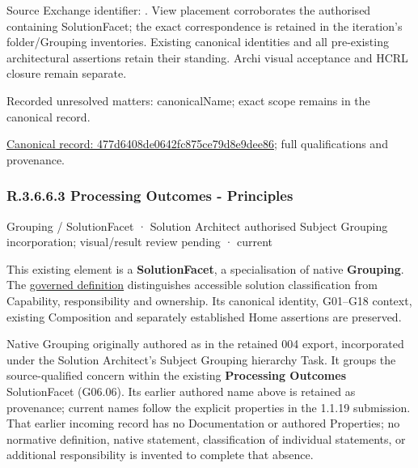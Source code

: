 Source Exchange identifier: \texttt{}. View placement corroborates
the authorised containing SolutionFacet; the exact correspondence is retained in the
iteration's folder/Grouping inventories. Existing canonical identities and all
pre-existing architectural assertions retain their standing. Archi visual
acceptance and HCRL closure remain separate.


{\small Recorded unresolved matters: canonicalName; exact scope remains in the canonical record.}\par
{\footnotesize \href{../../../../../../../continuum/grouping/477d6408de0642fc875ce79d8e9dee86.md}{Canonical record: 477d6408de0642fc875ce79d8e9dee86}; full qualifications and provenance.}\par
\subsubsection*{R.3.6.6.3 Processing Outcomes - Principles}
\label{navigation:R.3.6.6.3}

\label{element:5a4a41f263424c1aac14102b64f95bd0}
{\small Grouping / SolutionFacet · Solution Architect authorised Subject Grouping incorporation; visual/result review pending · current}\par

This existing element is a \textbf{SolutionFacet}, a specialisation of native
\textbf{Grouping}. The \href{\detokenize{../../../../../../../governance/continuum-representation.md#solutionfacet-classification--1119-candidate}}{governed definition}
distinguishes accessible solution classification from Capability, responsibility
and ownership. Its canonical identity, G01–G18 context, existing Composition
and separately established Home assertions are preserved.



Native Grouping originally authored as \texttt{} in the retained 004 export,
incorporated under the Solution Architect's Subject Grouping hierarchy Task.
It groups the source-qualified \texttt{} concern within
the existing \textbf{Processing Outcomes} SolutionFacet (G06.06). Its earlier authored name above is retained as provenance; current names
follow the explicit properties in the 1.1.19 submission.
That earlier incoming record has no Documentation or authored Properties; no normative
definition, native statement, classification of individual statements, or
additional responsibility is invented to complete that absence.



